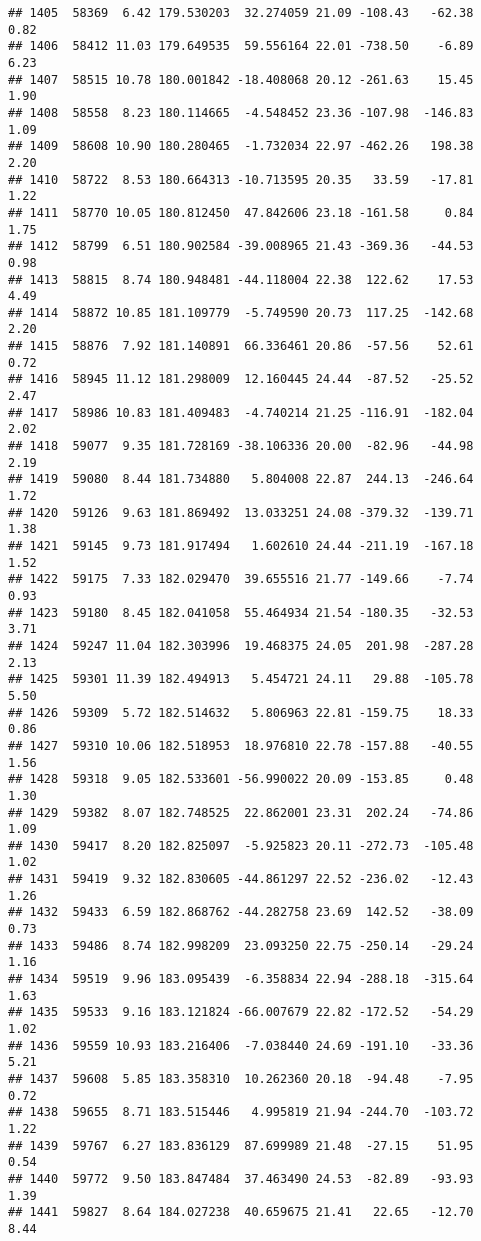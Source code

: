 \documentclass[]{article}
\begin{document}
\begin{verbatim}
## 1405  58369  6.42 179.530203  32.274059 21.09 -108.43   -62.38  0.82
## 1406  58412 11.03 179.649535  59.556164 22.01 -738.50    -6.89  6.23
## 1407  58515 10.78 180.001842 -18.408068 20.12 -261.63    15.45  1.90
## 1408  58558  8.23 180.114665  -4.548452 23.36 -107.98  -146.83  1.09
## 1409  58608 10.90 180.280465  -1.732034 22.97 -462.26   198.38  2.20
## 1410  58722  8.53 180.664313 -10.713595 20.35   33.59   -17.81  1.22
## 1411  58770 10.05 180.812450  47.842606 23.18 -161.58     0.84  1.75
## 1412  58799  6.51 180.902584 -39.008965 21.43 -369.36   -44.53  0.98
## 1413  58815  8.74 180.948481 -44.118004 22.38  122.62    17.53  4.49
## 1414  58872 10.85 181.109779  -5.749590 20.73  117.25  -142.68  2.20
## 1415  58876  7.92 181.140891  66.336461 20.86  -57.56    52.61  0.72
## 1416  58945 11.12 181.298009  12.160445 24.44  -87.52   -25.52  2.47
## 1417  58986 10.83 181.409483  -4.740214 21.25 -116.91  -182.04  2.02
## 1418  59077  9.35 181.728169 -38.106336 20.00  -82.96   -44.98  2.19
## 1419  59080  8.44 181.734880   5.804008 22.87  244.13  -246.64  1.72
## 1420  59126  9.63 181.869492  13.033251 24.08 -379.32  -139.71  1.38
## 1421  59145  9.73 181.917494   1.602610 24.44 -211.19  -167.18  1.52
## 1422  59175  7.33 182.029470  39.655516 21.77 -149.66    -7.74  0.93
## 1423  59180  8.45 182.041058  55.464934 21.54 -180.35   -32.53  3.71
## 1424  59247 11.04 182.303996  19.468375 24.05  201.98  -287.28  2.13
## 1425  59301 11.39 182.494913   5.454721 24.11   29.88  -105.78  5.50
## 1426  59309  5.72 182.514632   5.806963 22.81 -159.75    18.33  0.86
## 1427  59310 10.06 182.518953  18.976810 22.78 -157.88   -40.55  1.56
## 1428  59318  9.05 182.533601 -56.990022 20.09 -153.85     0.48  1.30
## 1429  59382  8.07 182.748525  22.862001 23.31  202.24   -74.86  1.09
## 1430  59417  8.20 182.825097  -5.925823 20.11 -272.73  -105.48  1.02
## 1431  59419  9.32 182.830605 -44.861297 22.52 -236.02   -12.43  1.26
## 1432  59433  6.59 182.868762 -44.282758 23.69  142.52   -38.09  0.73
## 1433  59486  8.74 182.998209  23.093250 22.75 -250.14   -29.24  1.16
## 1434  59519  9.96 183.095439  -6.358834 22.94 -288.18  -315.64  1.63
## 1435  59533  9.16 183.121824 -66.007679 22.82 -172.52   -54.29  1.02
## 1436  59559 10.93 183.216406  -7.038440 24.69 -191.10   -33.36  5.21
## 1437  59608  5.85 183.358310  10.262360 20.18  -94.48    -7.95  0.72
## 1438  59655  8.71 183.515446   4.995819 21.94 -244.70  -103.72  1.22
## 1439  59767  6.27 183.836129  87.699989 21.48  -27.15    51.95  0.54
## 1440  59772  9.50 183.847484  37.463490 24.53  -82.89   -93.93  1.39
## 1441  59827  8.64 184.027238  40.659675 21.41   22.65   -12.70  8.44

\end{verbatim}
\end{document}
